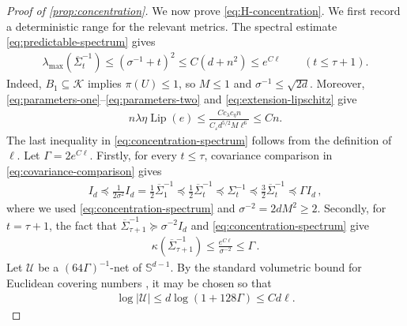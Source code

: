 \documentclass[11pt]{article}
\newcommand{\K}{\mathcal K}
\newcommand{\Lip}{\operatorname{Lip}}
\newcommand{\1}{\mathbf 1}
\newcommand{\eps}{\varepsilon}
\begin{document}
\begin{proof}[Proof of \cref{prop:concentration}]
    We now prove \eqref{eq:H-concentration}.
    We first record a deterministic range for the relevant metrics.
    The spectral estimate \eqref{eq:predictable-spectrum} gives
    \begin{align}
        \lambda_{\max}(\overline\Sigma_t^{-1})
        \leq
        \left(
        \sigma^{-1} + t
        \right)^2
        \leq
        C(d+n^2)
        \leq e^{C\ell}
        \qquad(t\leq\tau+1).
        \label{eq:concentration-spectrum}
    \end{align}
    Indeed, $B_1\subseteq\K$ implies $\pi(U)\leq1$, so
    $M\leq1$ and $\sigma^{-1}\leq\sqrt{2d}$.  Moreover,
    \eqref{eq:parameters-one}--\eqref{eq:parameters-two} and
    \eqref{eq:extension-lipschitz} give
    \begin{align}
        n\lambda\eta\Lip(e)
        \leq
        \frac{C c_\lambda c_\eta n}
        {C_\eps d^{5/2}M\ell^6}
        \leq Cn.
    \end{align}
    The last inequality in \eqref{eq:concentration-spectrum} follows from the
    definition of $\ell$.
    Let $\Gamma=2 e^{C\ell}$.
    Firstly, for every $t\leq\tau$, covariance comparison in \eqref{eq:covariance-comparison} gives
    \begin{align}
        I_d
        \preceq
        \frac{1}{2\sigma^2}I_d
        =
        \frac{1}{2} \overline\Sigma_1^{-1}
        \preceq
        \frac12\overline\Sigma_t^{-1}
        \preceq
        \Sigma_t^{-1}
        \preceq
        \frac32\overline\Sigma_t^{-1}
        \preceq
        \Gamma I_d\,,
        \label{eq:roundwise-spectral-range}
    \end{align}
    where we used \eqref{eq:concentration-spectrum}
    and $\sigma^{-2}=2dM^2\geq2$.
    Secondly, for $t=\tau+1$, the fact that
    $\overline\Sigma_{\tau+1}^{-1}\succeq\sigma^{-2}I_d$ and
    \eqref{eq:concentration-spectrum}
    give
    \begin{align}
        \kappa(\overline\Sigma_{\tau+1}^{-1})
        \leq \frac{
            e^{C\ell}
        }{
            \sigma^{-2}
        }
        \leq \Gamma\,.
    \end{align}
    Let $\mathcal U$ be a $(64\Gamma)^{-1}$-net of
    $\mathbb S^{d-1}$.
    By the standard volumetric bound for Euclidean covering numbers
    \cite[Corollary~4.2.13]{vershynin2018high}, it may be chosen so that
    \begin{align}
        \log|\mathcal U|
        \leq d\log(1+128\Gamma)
        \leq Cd\ell.
        \label{eq:H-net-cardinality}
    \end{align}

\end{proof}
\end{document}
